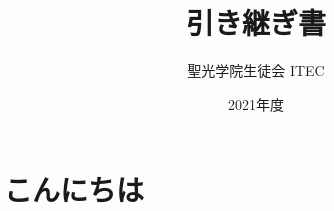 \documentclass[dvipdfmx,ja4,11pt,tittlepage]{jsarticle}
\title{引き継ぎ書}
\author{聖光学院生徒会 ITEC}
\date{2021年度}
\begin{document}
\section{こんにちは}
\end{document}
